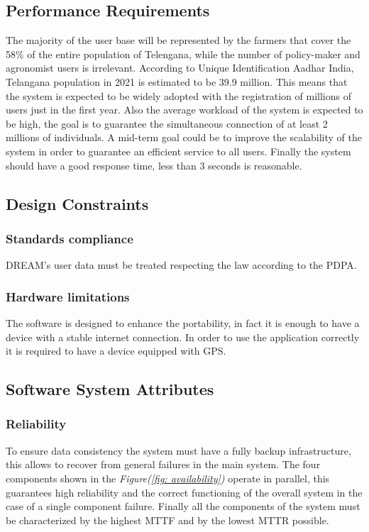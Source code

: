 \documentclass[table, 12pt]{article}
\begin{document}
\subsection{Performance Requirements}
The majority of the user base will be represented by the farmers that cover the 58\% \cite{specification} of the entire population of Telengana, while the number of policy-maker and agronomist users is irrelevant.
According to Unique Identification Aadhar India, Telangana population in 2021 is estimated to be 39.9 million\cite{population}.
This means that the system is expected to be widely adopted with the registration of millions of users just in the first year.
Also the average workload of the system is expected to be high, the goal is to guarantee the simultaneous connection of at least 2 millions of individuals.
A mid-term goal could be to improve the scalability of the system in order to guarantee an efficient service to all users.
Finally the system should have a good response time, less than 3 seconds is reasonable.
\subsection{Design Constraints}

\subsubsection{Standards compliance}
DREAM's user data must be treated respecting the law according to the PDPA\cite{pdpa}.
\subsubsection{Hardware limitations}
The software is designed to enhance the portability, in fact it is enough to have a device with a stable internet connection.
In order to use the application correctly it is required to have a device equipped with GPS.

\subsection{Software System Attributes}
\subsubsection{Reliability}
To ensure data consistency the system must have a fully backup infrastructure, this allows to recover from general failures in the main system.
The four components shown in the \textit{Figure(\ref{fig: availability})} operate in parallel, this guarantees high reliability and the correct functioning of the overall system in the case of a single component failure.
Finally all the components of the system must be characterized by the highest MTTF and by the lowest MTTR possible.
\end{document}
